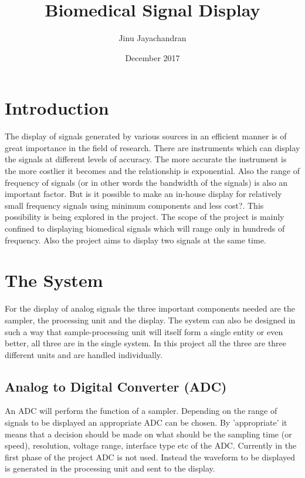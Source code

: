 \documentclass[12pt, a4paper, twoside]{article}
\title{Biomedical Signal Display}
\author{Jinu Jayachandran}
\date{December 2017}
\begin{document}
 
\begin{titlepage}
\maketitle
\end{titlepage}

\section{Introduction}
    The display of signals generated by various sources in an efficient manner is of great importance in the field of research. There are instruments which can display the signals at different levels of accuracy. The more accurate the instrument is the more costlier it becomes and the relationship is exponential. Also the range of frequency of signals (or in other words the bandwidth of the signals) is also an important factor. But is it possible to make an in-house display for relatively small frequency signals using minimum components and less cost?. This possibility is being explored in the project. The scope of the project is mainly confined to displaying biomedical signals which will range only in hundreds of frequency. Also the project aims to display two signals at the same time.
    
\section{The System}
    For the display of analog signals the three important components needed are the sampler, the processing unit and the display. The system can also be designed in such a way that sample-processing unit will itself form a single entity or even better, all three are in the single system. In this project all the three are three different units and are handled individually. 

\subsection{Analog to Digital Converter (ADC)}
    An ADC will perform the function of a sampler. Depending on the range of signals to be displayed an appropriate ADC can be chosen. By 'appropriate' it means that a decision should be made on what should be the sampling time (or speed), resolution, voltage range, interface type etc of the ADC. Currently in the first phase of the project ADC is not used. Instead the waveform to be displayed is generated in the processing unit and sent to the display.
\end{document}

